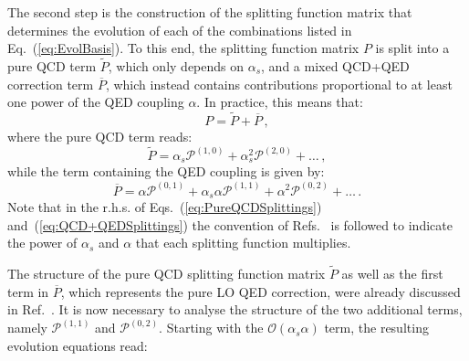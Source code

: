 The second step is the construction of the splitting function matrix
that determines the evolution of each of the combinations listed in
Eq.~(\ref{eq:EvolBasis}). To this end, the splitting function matrix
$P$ is split into a pure QCD term $\widetilde{P}$, which only depends
on $\alpha_s$, and a mixed QCD+QED correction term $\overline{P}$,
which instead contains contributions proportional to at least one
power of the QED coupling $\alpha$. In practice, this means that:
\begin{equation}
P = \widetilde{P} + \overline{P}\,,
\end{equation}
where the pure QCD term reads:
\begin{equation}\label{eq:PureQCDSplittings}
\widetilde{P} = \alpha_s \mathcal{P}^{(1,0)} + \alpha_s^2 \mathcal{P}^{(2,0)}+\dots\, ,
\end{equation}
while the term containing the QED coupling is given by:
\begin{equation}\label{eq:QCD+QEDSplittings}
\overline{P} = \alpha \mathcal{P}^{(0,1)} + \alpha_s\alpha \mathcal{P}^{(1,1)}+\alpha^2 \mathcal{P}^{(0,2)} + \dots \, .
\end{equation}
Note that in the r.h.s. of Eqs.~(\ref{eq:PureQCDSplittings})
and~(\ref{eq:QCD+QEDSplittings}) the convention of
Refs.~\cite{deFlorian:2015ujt,deFlorian:2016gvk} is followed to
indicate the power of $\alpha_s$ and $\alpha$ that each splitting
function multiplies.

The structure of the pure QCD splitting function matrix
$\widetilde{P}$ as well as the first term in $\overline{P}$, which
represents the pure LO QED correction, were already discussed in
Ref.~\cite{Bertone:2015lqa}. It is now necessary to analyse the
structure of the two additional terms, namely $\mathcal{P}^{(1,1)}$
and $\mathcal{P}^{(0,2)}$. Starting with the
$\mathcal{O}(\alpha_s\alpha)$ term, the resulting evolution equations
read:

